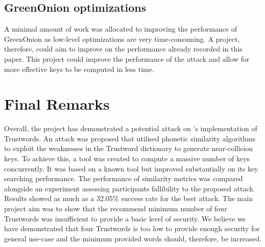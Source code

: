 \subsection*{GreenOnion optimizations}
A minimal amount of work was allocated to improving the performance of GreenOnion as low-level optimizations are very time-consuming. A project, therefore, could aim to improve on the performance already recorded in this paper. This project could improve the performance of the attack and allow for more effective keys to be computed in less time. 

\section{Final Remarks}
Overall, the project has demonstrated a potential attack on \pep's implementation of Trustwords. An attack was proposed that utilised phonetic similarity algorithms to exploit the weaknesses in the Trustword dictionary to generate near-collision keys. To achieve this, a tool was created to compute a massive number of keys concurrently. It was based on a known tool but improved substantially on its key searching performance. The performance of similarity metrics was compared alongside an experiment assessing participants fallibility to the proposed attack. Results showed as much as a 32.05\% success rate for the best attack. The main project aim was to show that the recommend minimum number of four Trustwords was insufficient to provide a basic level of security. We believe we have demonstrated that four Trustwords is too low to provide enough security for general use-case and the minimum provided words should, therefore, be increased.